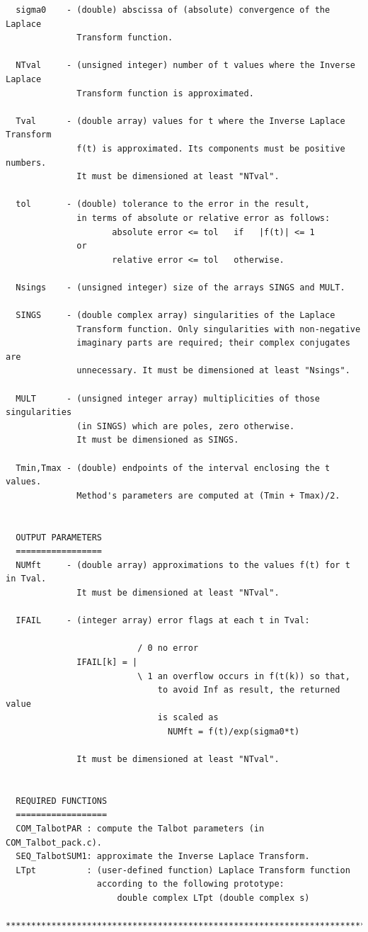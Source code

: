 \documentclass[a4paper,10pt]{report}%
\begin{document}
\begin{lstlisting}
  sigma0    - (double) abscissa of (absolute) convergence of the Laplace
              Transform function.

  NTval     - (unsigned integer) number of t values where the Inverse Laplace
              Transform function is approximated.

  Tval      - (double array) values for t where the Inverse Laplace Transform
              f(t) is approximated. Its components must be positive numbers.
              It must be dimensioned at least "NTval".

  tol       - (double) tolerance to the error in the result,
              in terms of absolute or relative error as follows:
                     absolute error <= tol   if   |f(t)| <= 1
              or
                     relative error <= tol   otherwise.

  Nsings    - (unsigned integer) size of the arrays SINGS and MULT.

  SINGS     - (double complex array) singularities of the Laplace
              Transform function. Only singularities with non-negative
              imaginary parts are required; their complex conjugates are
              unnecessary. It must be dimensioned at least "Nsings".

  MULT      - (unsigned integer array) multiplicities of those singularities
              (in SINGS) which are poles, zero otherwise.
              It must be dimensioned as SINGS.

  Tmin,Tmax - (double) endpoints of the interval enclosing the t values.
              Method's parameters are computed at (Tmin + Tmax)/2.


  OUTPUT PARAMETERS
  =================
  NUMft     - (double array) approximations to the values f(t) for t in Tval.
              It must be dimensioned at least "NTval".

  IFAIL     - (integer array) error flags at each t in Tval:

                          / 0 no error
              IFAIL[k] = |
                          \ 1 an overflow occurs in f(t(k)) so that,
                              to avoid Inf as result, the returned value
                              is scaled as
                                NUMft = f(t)/exp(sigma0*t)

              It must be dimensioned at least "NTval".


  REQUIRED FUNCTIONS
  ==================
  COM_TalbotPAR : compute the Talbot parameters (in COM_Talbot_pack.c).
  SEQ_TalbotSUM1: approximate the Inverse Laplace Transform.
  LTpt          : (user-defined function) Laplace Transform function
                  according to the following prototype:
                      double complex LTpt (double complex s)

*****************************************************************************\
\end{lstlisting}
\end{document}
